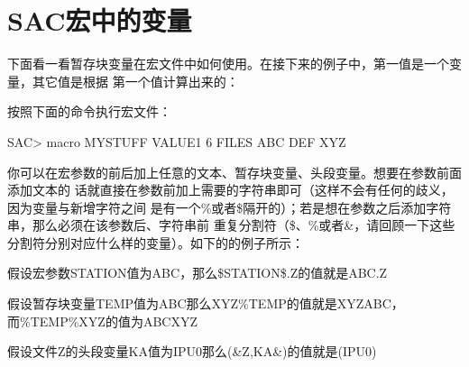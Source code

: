 \section{SAC宏中的变量}
下面看一看暂存块变量在宏文件中如何使用。在接下来的例子中，第一值是一个变量，其它值是根据
第一个值计算出来的：
按照下面的命令执行宏文件：
\begin{SACCode}
SAC> macro MYSTUFF VALUE1 6 FILES ABC DEF XYZ 
\end{SACCode}

你可以在宏参数的前后加上任意的文本、暂存块变量、头段变量。想要在参数前面添加文本的
话就直接在参数前加上需要的字符串即可（这样不会有任何的歧义，因为变量与新增字符之间
是有一个\%或者\$隔开的）；若是想在参数之后添加字符串，那么必须在该参数后、字符串前
重复分割符（\$、\%或者\&，请回顾一下这些分割符分别对应什么样的变量）。如下的的例子所示：

假设宏参数STATION值为ABC，那么\$STATION\$.Z的值就是ABC.Z

假设暂存块变量TEMP值为ABC那么XYZ\%TEMP的值就是XYZABC，而\%TEMP\%XYZ的值为ABCXYZ

假设文件Z的头段变量KA值为IPU0那么(\&Z,KA\&)的值就是(IPU0)
